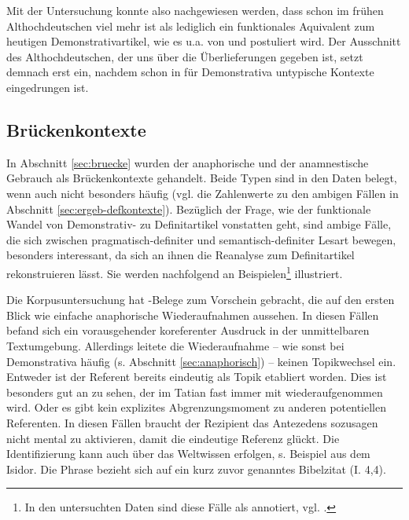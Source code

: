 Mit der Untersuchung konnte also nachgewiesen werden, dass  schon im frühen Althochdeutschen viel mehr ist als lediglich ein funktionales Aquivalent zum heutigen Demonstrativartikel, wie es u.a. von \textcite{Philippi1997} und \textcite{Demske2001} postuliert wird. Der Ausschnitt des Althochdeutschen, der uns über die Überlieferungen gegeben ist, setzt demnach erst ein, nachdem  schon in für Demonstrativa untypische Kontexte eingedrungen ist. 


\subsection{Brückenkontexte}\label{sec:disk-bruecken}

In Abschnitt \ref{sec:bruecke} wurden der anaphorische und der anamnestische Gebrauch als Brückenkontexte gehandelt. Beide Typen sind in den Daten belegt, wenn auch nicht besonders häufig (vgl. die Zahlenwerte zu den ambigen Fällen in Abschnitt \ref{sec:ergeb-defkontexte}). Bezüglich der Frage, wie der funktionale Wandel von Demonstrativ- zu Definitartikel vonstatten geht, sind ambige Fälle, die sich zwischen pragmatisch-definiter und semantisch-definiter Lesart bewegen, besonders interessant, da sich an ihnen die Reanalyse zum Definitartikel rekonstruieren lässt. Sie werden nachfolgend an Beispielen\footnote{In den untersuchten Daten sind diese Fälle als  annotiert, vgl. \textcite{HZKYL4_2020}.} illustriert. 

 

Die Korpusuntersuchung hat -Belege zum Vorschein gebracht, die auf den ersten Blick wie einfache anaphorische Wiederaufnahmen aussehen. In diesen Fällen befand sich ein vorausgehender koreferenter Ausdruck in der unmittelbaren Textumgebung. Allerdings leitete die Wiederaufnahme -- wie sonst bei Demonstrativa häufig (s. Abschnitt \ref{sec:anaphorisch}) -- keinen Topikwechsel ein. Entweder ist der Referent bereits eindeutig als Topik etabliert worden. Dies ist besonders gut an  zu sehen, der im Tatian fast immer mit  wiederaufgenommen wird. Oder es gibt kein explizites Abgrenzungsmoment zu anderen potentiellen Referenten.
In diesen Fällen braucht der Rezipient das Antezedens sozusagen nicht mental zu aktivieren, damit die eindeutige Referenz glückt. Die Identifizierung kann auch über das Weltwissen erfolgen, s. Beispiel  aus dem Isidor. Die Phrase    bezieht sich auf ein kurz zuvor genanntes Bibelzitat  (I. 4,4).


